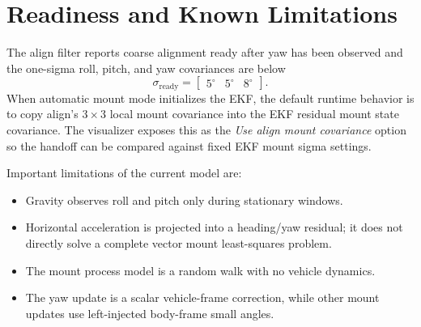 \documentclass[11pt]{article}
\begin{document}
\section{Readiness and Known Limitations}

The align filter reports coarse alignment ready after yaw has been observed and
the one-sigma roll, pitch, and yaw covariances are below
\begin{equation}
  \sigma_{\mathrm{ready}} =
  \begin{bmatrix}5^\circ & 5^\circ & 8^\circ\end{bmatrix}.
\end{equation}
When automatic mount mode initializes the EKF, the default runtime behavior is
to copy align's \(3\times3\) local mount covariance into the EKF residual mount
state covariance. The visualizer exposes this as the \emph{Use align mount
covariance} option so the handoff can be compared against fixed EKF mount
sigma settings.

Important limitations of the current model are:
\begin{itemize}[leftmargin=1.5em]
\item Gravity observes roll and pitch only during stationary windows.
\item Horizontal acceleration is projected into a heading/yaw residual; it does not
directly solve a complete vector mount least-squares problem.
\item The mount process model is a random walk with no vehicle dynamics.
\item The yaw update is a scalar vehicle-frame correction, while other mount
updates use left-injected body-frame small angles.
\end{itemize}
\end{document}
